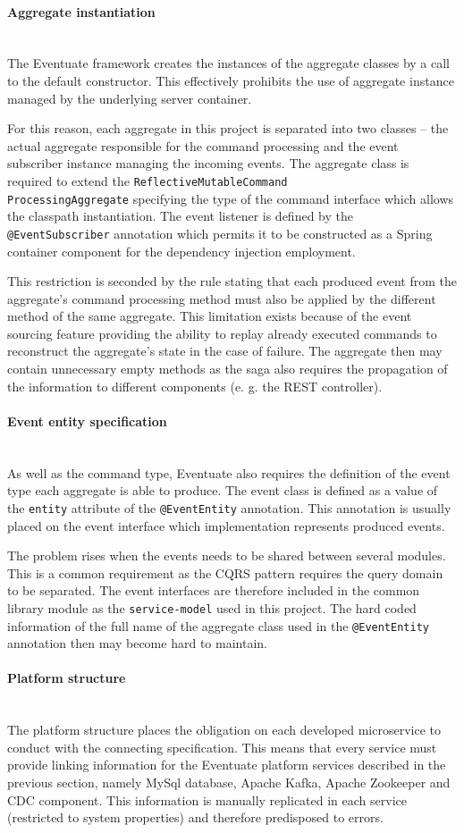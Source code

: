 \documentclass[oneside,
  digital, %
  table,   %
  nolof,     %
  nolot,     %
]{fithesis3}
\newcommand{\newlinepar}[1]{\paragraph{#1}\needspace{4\baselineskip}\mbox{}\\}
\begin{document}
\newlinepar{Aggregate instantiation}

The Eventuate framework creates the instances of the aggregate classes by a call to the default constructor. This effectively prohibits the use of aggregate instance managed by the underlying server container. 

For this reason, each aggregate in this project is separated into two classes -- the actual aggregate responsible for the command processing and the event subscriber instance managing the incoming events. The  aggregate class is required to extend the \texttt{ReflectiveMutableCommand\\ProcessingAggregate} specifying the type of the command interface which allows the classpath instantiation. The event listener is defined by the \texttt{@EventSubscriber} annotation which permits it to be constructed as a Spring container component for the dependency injection employment. 

This restriction is seconded by the rule stating that each produced event from the aggregate's command processing method must also be applied by the different method of the same aggregate. This limitation exists because of the event sourcing feature providing the ability to replay already executed commands to reconstruct the aggregate's state in the case of failure. The aggregate then may contain unnecessary empty methods as the saga also requires the propagation of the information to different components (e. g. the REST controller).


\newlinepar{Event entity specification}

As well as the command type, Eventuate also requires the definition of the event type each aggregate is able to produce. The event class is defined as a value of the \texttt{entity} attribute of the \texttt{@EventEntity} annotation. This annotation is usually placed on the event interface which implementation represents produced events.

The problem rises when the events needs to be shared between several modules. This is a common requirement as the CQRS pattern requires the query domain to be separated. The event interfaces are therefore included in the common library module as the \texttt{service-model} used in this project. The hard coded information of the full name of the aggregate class used in the \texttt{@EventEntity} annotation then may become hard to maintain.

\newlinepar{Platform structure}

The platform structure places the obligation on each developed microservice to conduct with the connecting specification. This means that every service must provide linking information for the Eventuate platform services described in the previous section, namely MySql database, Apache Kafka, Apache Zookeeper and CDC component. This information is manually replicated in each service (restricted to system properties) and therefore predisposed to errors.
\end{document}
